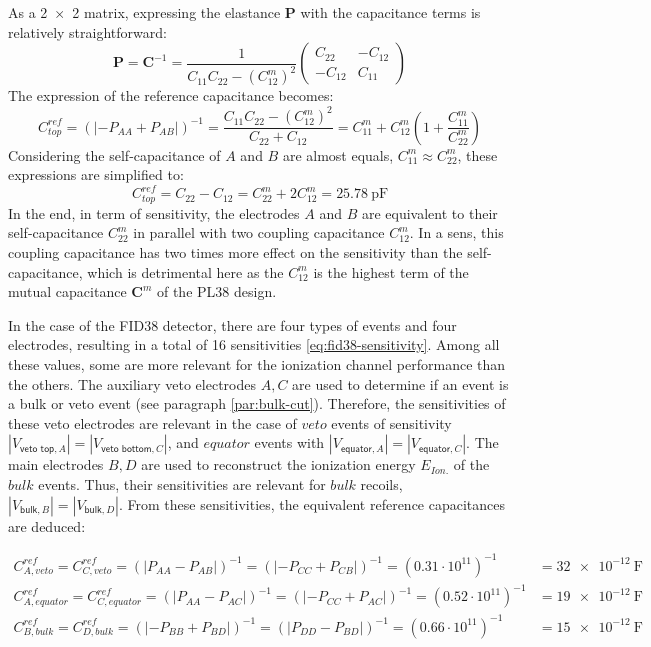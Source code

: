 As a \num{2 x 2} matrix, expressing the elastance $\bm{P}$ with the capacitance terms is relatively straightforward:
\begin{equation}
\bm{P} = \bm{C}^{-1} = 
\frac{1}{C_{11} C_{22} - (C_{12}^m)^2}
 \begin{pmatrix}
C_{22} & -C_{12} \\ 
-C_{12} & C_{11}
\end{pmatrix}
\end{equation}
The expression of the reference capacitance becomes:
\begin{equation}
C_{top}^{ref} = \left( | -P_{AA} + P_{AB} |\right)^{-1}
=  \frac{C_{11} C_{22} - (C_{12}^m)^2}{C_{22} + C_{12}}
= C_{11}^m + C_{12}^m \left( 1 + \frac{C_{11}^m}{C_{22}^m} \right)
\end{equation}
Considering the self-capacitance of $A$ and $B$ are almost equals, $C_{11}^m \approx C_{22}^m$, these expressions are simplified to:
\begin{equation}
\label{eq:pl38-ref-capa-expr}
C_{top}^{ref} = C_{22} - C_{12} = C_{22}^m + 2 C_{12}^m = \SI{25.78}{\pico\farad}
\end{equation}
In the end, in term of sensitivity, the electrodes $A$ and $B$ are equivalent to their self-capacitance $C_{22}^m$ in parallel with two coupling capacitance $C_{12}^m$. In a sens, this coupling capacitance has two times more effect on the sensitivity than the self-capacitance, which is detrimental here as the $C_{12}^m$ is the highest term of the mutual capacitance $\bm{C}^m$ of the PL38 design.

In the case of the FID38 detector, there are four types of events and four electrodes, resulting in a total of 16 sensitivities \ref{eq:fid38-sensitivity}. Among all these values, some are more relevant for the ionization channel performance than the others. The auxiliary veto electrodes $A,C$ are used to determine if an event is a bulk or veto event (see paragraph \ref{par:bulk-cut}). Therefore, the sensitivities of these veto electrodes are relevant in the case of $veto$ events of sensitivity $|V_{\textsf{veto top}, A}|=|V_{\textsf{veto bottom}, C}|$, and $equator$ events with $|V_{\textsf{equator}, A}|=|V_{\textsf{equator}, C}|$. The main electrodes $B,D$ are used to reconstruct the ionization energy $E_{Ion.}$ of the $bulk$ events. Thus, their sensitivities are relevant for $bulk$ recoils, $|V_{\textsf{bulk}, B}|=|V_{\textsf{bulk}, D}|$. From these sensitivities, the equivalent reference capacitances are deduced:

\begin{align}
C_{A, veto}^{ref} = C_{C, veto}^{ref}
= \left( | P_{AA} - P_{AB} |\right)^{-1}
= \left( | -P_{CC} + P_{CB} |\right)^{-1}
= (0.31 \cdot 10^{11})^{-1}
&= \SI{32e-12}{\farad}
\\
C_{A, equator}^{ref} = C_{C, equator}^{ref}
= \left( | P_{AA} - P_{AC} |\right)^{-1}
= \left( | -P_{CC} + P_{AC} |\right)^{-1}
=(0.52 \cdot 10^{11})^{-1}
&= \SI{19e-12}{\farad}
\\
C_{B, bulk}^{ref} = C_{D, bulk}^{ref}
= \left( | -P_{BB} + P_{BD} |\right)^{-1}
= \left( | P_{DD} - P_{BD} |\right)^{-1}
= (0.66 \cdot 10^{11})^{-1}
&= \SI{15e-12}{\farad}
\end{align}

